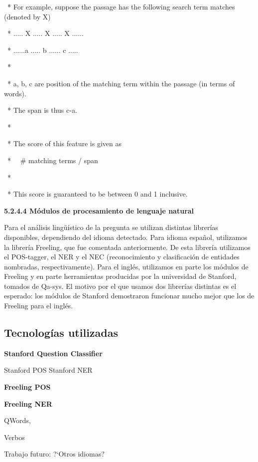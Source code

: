 \ * For example, suppose the passage has the following search term
matches (denoted by X)

\ * ..... X ..... X ..... X ......

\ * ......a ..... b ...... c .....

\ * 

\ * a, b, c are position of the matching term within the passage (in
terms of words).

\ * The span is thus {\textbar}c-a{\textbar}.

\ * 

\ * The score of this feature is given as 

\ * \ \ \# matching terms / span

\ * 

\ * This score is guaranteed to be between 0 and 1 inclusive.


\bigskip

\textbf{5.2.4.4 M\'odulos de procesamiento de lenguaje natural}

Para el an\'alisis ling\"u\'istico de la pregunta se utilizan distintas
librer\'ias disponibles, dependiendo del idioma detectado. Para idioma
espa\~nol, utilizamos la librer\'ia Freeling, que fue comentada
anteriormente. De esta librer\'ia utilizamos el POS-tagger, el NER y el
NEC (reconocimiento y clasificaci\'on de entidades nombradas,
respectivamente). Para el ingl\'es, utilizamos en parte los m\'odulos
de Freeling y en parte herramientas producidas por la universidad de
Stanford, tomados de Qa-sys. El motivo por el que usamos dos
librer\'ias distintas es el esperado: los m\'odulos de Stanford
demostraron funcionar mucho mejor que los de Freeling para el ingl\'es.

\subsection{Tecnolog\'ias utilizadas}


\bigskip

\textbf{Stanford Question Classifier }


Stanford POS\newline
Stanford NER

\textbf{Freeling POS}

\textbf{Freeling NER}

QWords, 

Verbos

Trabajo futuro: ?`Otros idiomas?


\bigskip

